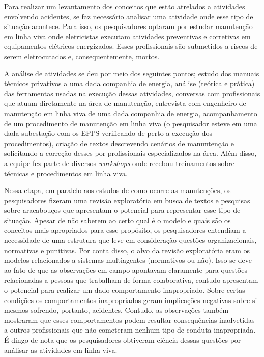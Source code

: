 Para realizar um levantamento dos conceitos que estão atrelados a atividades envolvendo acidentes, se faz necessário analisar uma atividade onde esse tipo de situação acontece. Para isso, os pesquisadores optaram por estudar manutenção em linha viva onde eletricistas executam atividades preventivas e corretivas em equipamentos elétricos energizados. Esses profissionais são submetidos a riscos de serem eletrocutados e, consequentemente, mortos. 

A análise de atividades se deu por meio dos seguintes pontos; estudo dos manuais técnicos privativos a uma dada companhia de energia, análise (teórica e prática) das ferramentas usadas na execução dessas atividades, conversas com profissionais que atuam diretamente na área de manutenção, entrevista com engenheiro de manutenção em linha viva de uma dada companhia de energia, acompanhamento de um procedimento de manutenção em linha viva (o pesquisador esteve em uma dada subestação com os EPI'S verificando de perto a execução dos procedimentos), criação de textos descrevendo cenários de manuntenção e solicitando a correção desses por profissionais especializados na área. Além disso, a equipe fez parte de diversos \textit{workshops} onde recebou treinamentos sobre técnicas e procedimentos em linha viva. 

Nessa etapa, em paralelo aos estudos de como ocorre as manutenções, os pesquisadores fizeram uma revisão exploratória em busca de textos e pesquisas sobre aracabouços que apresentam o potencial para representar esse tipo de situação. Apesar de não saberem ao certo qual é o modelo e quais são os conceitos mais apropriados para esse propósito, os pesquisadores entendiam a necessidade de uma estrutura que leve em consideração questões organizacionais, normativas e punitivas. Por conta disso, o alvo da revisão exploratória eram os modelos relacionados a sistemas multiagentes (normativos ou não). Isso se deve ao fato de que as observações em campo apontavam claramente para questões relacionadas a pessoas que trabalham de forma colaborativa, contudo apresentam o potencial para realizar um dado comportamento inapropriado. Sobre certas condições os comportamentos inapropriados geram implicações negativas sobre si mesmos sofrendo, portanto, acidentes. Contudo, as observações também mostraram que esses comportamentos podem resultar consequências inadvetidas a outros profissionais que não cometeram nenhum tipo de conduta inapropriada. É dingo de nota que os pesquisadores obtiveram ciência dessas questões por análisar as atividades em linha viva.